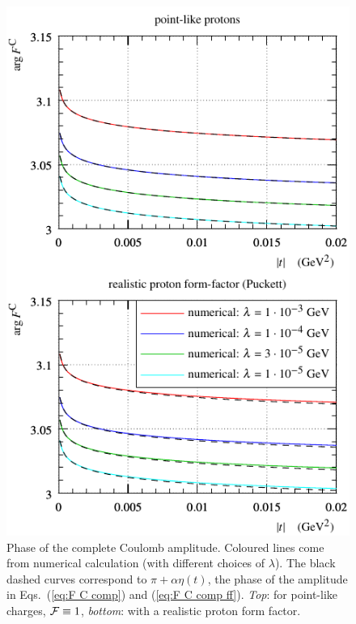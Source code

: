 \documentclass{appolb}
\begin{document}
\begin{figure}[h]
\begin{center}
\includegraphics{fig/coul_complete_cmp_lambda_phase.pdf}
\caption{Phase of the complete Coulomb amplitude. Coloured lines come from numerical calculation (with different choices of $\lambda$). The black dashed curves correspond to $\pi + \alpha\eta(t)$, the phase of the amplitude in Eqs.~(\ref{eq:F C comp}) and (\ref{eq:F C comp ff}). {\it Top}: for point-like charges, ${\cal F} \equiv 1$, {\it bottom}: with a realistic proton form factor.}
\label{f:arg F C}
\end{center}
\end{figure}
\end{document}
